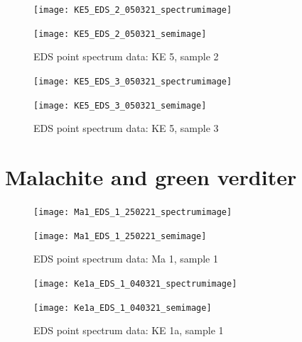 \begin{figure}[H]
\centering
\begin{minipage}{.45\textwidth}
  \centering
  \texttt{[image: KE5\_EDS\_2\_050321\_spectrumimage]}
\end{minipage}
\begin{minipage}{.45\textwidth}
  \centering
  \texttt{[image: KE5\_EDS\_2\_050321\_semimage]}
\end{minipage}
\caption[EDS point spectrum data: KE 5, sample 2]{EDS point spectrum data: KE 5, sample 2}
\label{fig:ke5_point_eds_2}
\end{figure}

\begin{figure}[H]
\centering
\begin{minipage}{.45\textwidth}
  \centering
  \texttt{[image: KE5\_EDS\_3\_050321\_spectrumimage]}
\end{minipage}
\begin{minipage}{.45\textwidth}
  \centering
  \texttt{[image: KE5\_EDS\_3\_050321\_semimage]}
\end{minipage}
\caption[EDS point spectrum data: KE 5, sample 3]{EDS point spectrum data: KE 5, sample 3}
\label{fig:ke5_point_eds_3}
\end{figure}


\section{Malachite and green verditer}


\begin{figure}[H]
\centering
\begin{minipage}{.45\textwidth}
  \centering
  \texttt{[image: Ma1\_EDS\_1\_250221\_spectrumimage]}
\end{minipage}
\begin{minipage}{.45\textwidth}
  \centering
  \texttt{[image: Ma1\_EDS\_1\_250221\_semimage]}
\end{minipage}
\caption[EDS point spectrum data: Ma 1, sample 1]{EDS point spectrum data: Ma 1, sample 1}
\label{fig:ma1_point_eds_1}
\end{figure}



\begin{figure}[H]
\centering
\begin{minipage}{.45\textwidth}
  \centering
  \texttt{[image: Ke1a\_EDS\_1\_040321\_spectrumimage]}
\end{minipage}
\begin{minipage}{.45\textwidth}
  \centering
  \texttt{[image: Ke1a\_EDS\_1\_040321\_semimage]}
\end{minipage}
\caption[EDS point spectrum data: KE 1a, sample 1]{EDS point spectrum data: KE 1a, sample 1}
\label{fig:ke1a_point_eds_1}
\end{figure}

